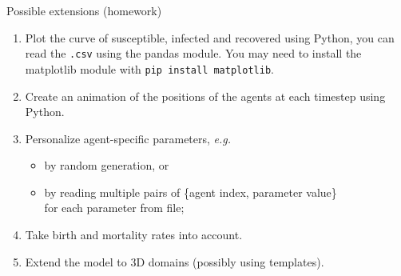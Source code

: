\documentclass[10pt,aspectratio=169]{beamer}
\begin{document}
\begin{frame}{Possible extensions (homework)}
\begin{enumerate}
    \item Plot the curve of susceptible, infected and recovered using Python, you can read the \texttt{.csv} using the pandas module. You may need to install the matplotlib module with \texttt{pip install matplotlib}.
    \item Create an animation of the positions of the agents at each timestep using Python.
    \item Personalize agent-specific parameters, \textit{e.g.}
    \begin{itemize}
        \item by random generation, or
        \item by reading multiple pairs of \{agent index, parameter value\}\\
              for each parameter from file;
    \end{itemize}
    \item Take birth and mortality rates into account.
    \item Extend the model to 3D domains (possibly using templates).
\end{enumerate}
\end{frame}
\end{document}
